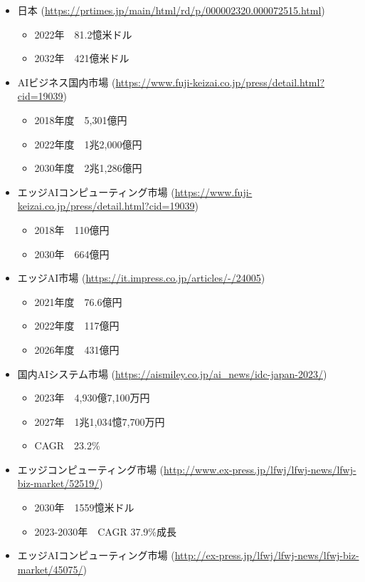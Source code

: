 \begin{itemize}
\begin{itemize}
			\item 日本 (\url{https://prtimes.jp/main/html/rd/p/000002320.000072515.html})
			\begin{itemize}
				\item 2022年　81.2憶米ドル
				\item 2032年　421億米ドル
			\end{itemize}
			\item AIビジネス国内市場 (\url{https://www.fuji-keizai.co.jp/press/detail.html?cid=19039})
			\begin{itemize}
				\item 2018年度　5,301億円
				\item 2022年度　1兆2,000億円
				\item 2030年度　2兆1,286億円
			\end{itemize}
			\item エッジAIコンピューティング市場 (\url{https://www.fuji-keizai.co.jp/press/detail.html?cid=19039})
			\begin{itemize}
				\item 2018年　110億円
				\item 2030年　664億円
			\end{itemize}
			\item エッジAI市場 (\url{https://it.impress.co.jp/articles/-/24005})
			\begin{itemize}
				\item 2021年度　76.6億円
				\item 2022年度　117億円
				\item 2026年度　431億円
			\end{itemize}
			\item 国内AIシステム市場 (\url{https://aismiley.co.jp/ai_news/idc-japan-2023/})
			\begin{itemize}
				\item 2023年　4,930億7,100万円
				\item 2027年　1兆1,034憶7,700万円
				\item CAGR　23.2\%
			\end{itemize}
		\item エッジコンピューティング市場 (\url{http://www.ex-press.jp/lfwj/lfwj-news/lfwj-biz-market/52519/})
		\begin{itemize}
			\item 2030年　1559憶米ドル
			\item 2023-2030年　CAGR 37.9\%成長
		\end{itemize}
		\item エッジAIコンピューティング市場 (\url{http://ex-press.jp/lfwj/lfwj-news/lfwj-biz-market/45075/})

\end{itemize}
\end{itemize}
